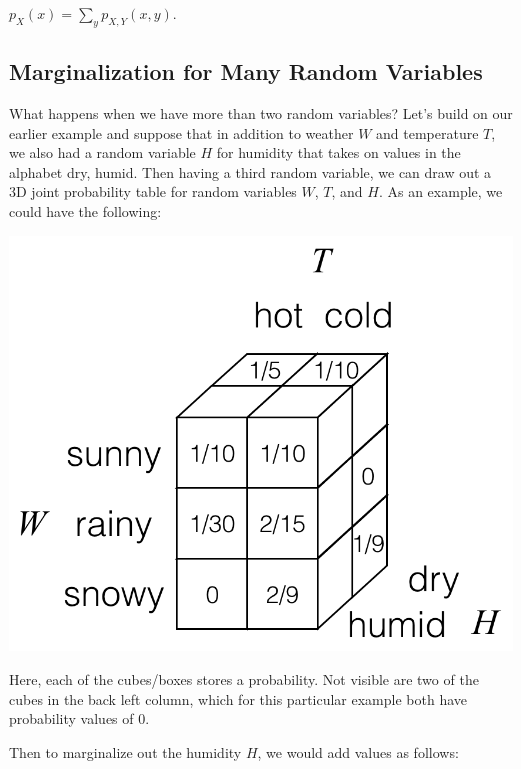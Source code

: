 \documentclass[6008notes.tex]{subfiles}
\begin{document}
{\centering$p_{X}(x)=\sum _{y}p_{X,Y}(x,y).$ \par}
 
\subsection{Marginalization for Many Random Variables}

What happens when we have more than two random variables? Let's build on our earlier example and suppose that in addition to weather $W$ and temperature $T$, we also had a random variable $H$ for humidity that takes on values in the alphabet {dry, humid}. Then having a third random variable, we can draw out a 3D joint probability table for random variables $W$, $T$, and $H$. As an example, we could have the following:

{\includegraphics[scale=0.4]{images_sec-joint-rv-marg-many-rv-joint-table} \par}

Here, each of the cubes/boxes stores a probability. Not visible are two of the cubes in the back left column, which for this particular example both have probability values of 0.

Then to marginalize out the humidity $H$, we would add values as follows:
\end{document}
